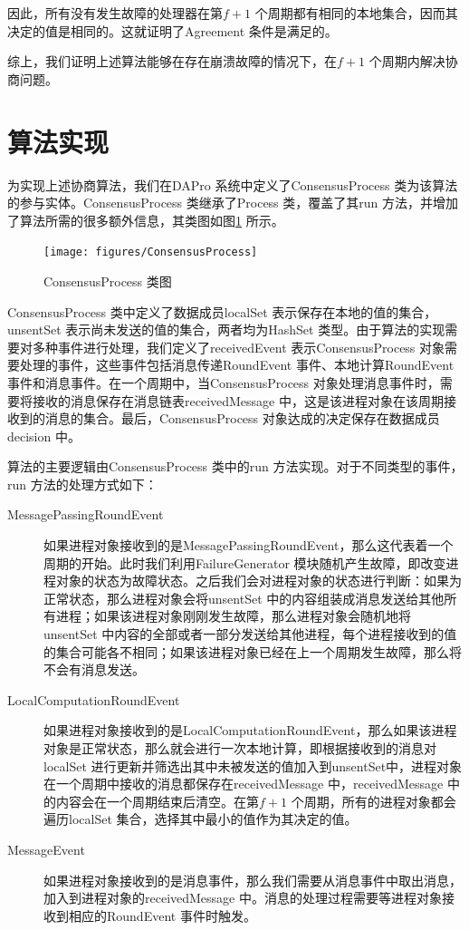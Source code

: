     因此，所有没有发生故障的处理器在第$f+1$ 个周期都有相同的本地集合，因而其决定的值是相同的。这就证明了Agreement 条件是满足的\cite{attiya2004distributed}。

    综上，我们证明上述算法能够在存在崩溃故障的情况下，在$f+1$ 个周期内解决协商问题。

    \section{算法实现}
    为实现上述协商算法，我们在DAPro 系统中定义了ConsensusProcess 类为该算法的参与实体。ConsensusProcess 类继承了Process 类，覆盖了其run 方法，并增加了算法所需的很多额外信息，其类图如图\ref{ConsensusProcess} 所示。
    \begin{figure}[ht]
        \centering
        \texttt{[image: figures/ConsensusProcess]}\\
        \caption{ConsensusProcess 类图}\label{ConsensusProcess}
    \end{figure}

    ConsensusProcess 类中定义了数据成员localSet 表示保存在本地的值的集合，unsentSet 表示尚未发送的值的集合，两者均为HashSet 类型。由于算法的实现需要对多种事件进行处理，我们定义了receivedEvent 表示ConsensusProcess 对象需要处理的事件，这些事件包括消息传递RoundEvent 事件、本地计算RoundEvent 事件和消息事件。在一个周期中，当ConsensusProcess 对象处理消息事件时，需要将接收的消息保存在消息链表receivedMessage 中，这是该进程对象在该周期接收到的消息的集合。最后，ConsensusProcess 对象达成的决定保存在数据成员decision 中。

    算法的主要逻辑由ConsensusProcess 类中的run 方法实现。对于不同类型的事件，run 方法的处理方式如下：
    \begin{description}
      \item[MessagePassingRoundEvent] 如果进程对象接收到的是MessagePassingRoundEvent，那么这代表着一个周期的开始。此时我们利用FailureGenerator 模块随机产生故障，即改变进程对象的状态为故障状态。之后我们会对进程对象的状态进行判断：如果为正常状态，那么进程对象会将unsentSet 中的内容组装成消息发送给其他所有进程；如果该进程对象刚刚发生故障，那么进程对象会随机地将unsentSet 中内容的全部或者一部分发送给其他进程，每个进程接收到的值的集合可能各不相同；如果该进程对象已经在上一个周期发生故障，那么将不会有消息发送。
      \item[LocalComputationRoundEvent] 如果进程对象接收到的是LocalComputationRoundEvent，那么如果该进程对象是正常状态，那么就会进行一次本地计算，即根据接收到的消息对localSet 进行更新并筛选出其中未被发送的值加入到unsentSet中，进程对象在一个周期中接收的消息都保存在receivedMessage 中，receivedMessage 中的内容会在一个周期结束后清空。在第$f+1$ 个周期，所有的进程对象都会遍历localSet 集合，选择其中最小的值作为其决定的值。
      \item[MessageEvent] 如果进程对象接收到的是消息事件，那么我们需要从消息事件中取出消息，加入到进程对象的receivedMessage 中。消息的处理过程需要等进程对象接收到相应的RoundEvent 事件时触发。
    \end{description}

